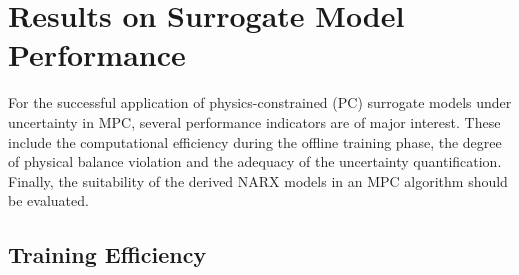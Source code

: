 \chapter{Results on Surrogate Model Performance}
For the successful application of physics-constrained (PC) surrogate models
under uncertainty in MPC, several performance indicators are of major interest.
These include the computational efficiency during the offline training phase,
the degree of physical balance violation and the adequacy of the uncertainty quantification.
Finally, the suitability of the derived NARX models in an MPC algorithm should be evaluated.


\section{Training Efficiency}
\label{results:sec:training-efficiency}

